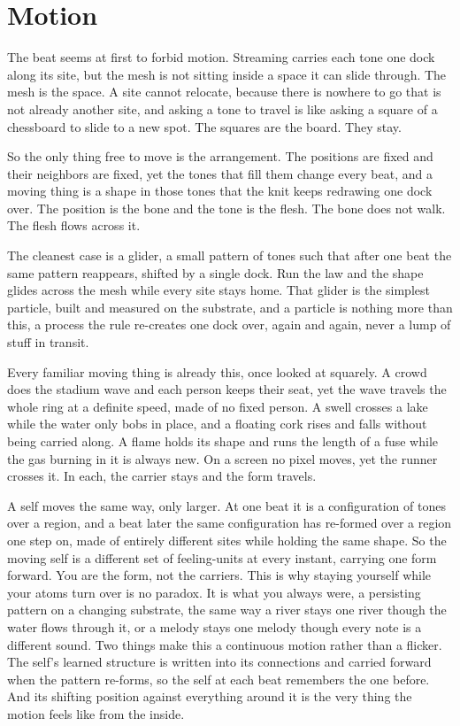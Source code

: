 \section{Motion}

The beat seems at first to forbid motion. Streaming carries each tone one dock along its site, but the mesh is not sitting inside a space it can slide through. The mesh is the space. A site cannot relocate, because there is nowhere to go that is not already another site, and asking a tone to travel is like asking a square of a chessboard to slide to a new spot. The squares are the board. They stay.

So the only thing free to move is the arrangement. The positions are fixed and their neighbors are fixed, yet the tones that fill them change every beat, and a moving thing is a shape in those tones that the knit keeps redrawing one dock over. The position is the bone and the tone is the flesh. The bone does not walk. The flesh flows across it.

The cleanest case is a glider, a small pattern of tones such that after one beat the same pattern reappears, shifted by a single dock. Run the law and the shape glides across the mesh while every site stays home. That glider is the simplest particle, built and measured on the substrate, and a particle is nothing more than this, a process the rule re-creates one dock over, again and again, never a lump of stuff in transit. \cite{pollard2026vibetest}

Every familiar moving thing is already this, once looked at squarely. A crowd does the stadium wave and each person keeps their seat, yet the wave travels the whole ring at a definite speed, made of no fixed person. A swell crosses a lake while the water only bobs in place, and a floating cork rises and falls without being carried along. A flame holds its shape and runs the length of a fuse while the gas burning in it is always new. On a screen no pixel moves, yet the runner crosses it. In each, the carrier stays and the form travels.

A self moves the same way, only larger. At one beat it is a configuration of tones over a region, and a beat later the same configuration has re-formed over a region one step on, made of entirely different sites while holding the same shape. So the moving self is a different set of feeling-units at every instant, carrying one form forward. You are the form, not the carriers. This is why staying yourself while your atoms turn over is no paradox. It is what you always were, a persisting pattern on a changing substrate, the same way a river stays one river though the water flows through it, or a melody stays one melody though every note is a different sound. Two things make this a continuous motion rather than a flicker. The self's learned structure is written into its connections and carried forward when the pattern re-forms, so the self at each beat remembers the one before. And its shifting position against everything around it is the very thing the motion feels like from the inside.

